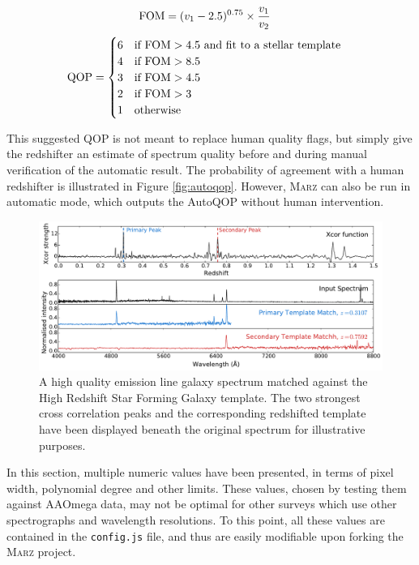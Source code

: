 \documentclass[5p]{elsarticle}
\newcommand{\marz}{\textsc{Marz}}
\begin{document}
\begin{align}
{\rm FOM} &= (v_1-2.5)^{0.75} \times \frac{v_1}{v_2} \label{eq:autoqop3}
\end{align}
\begin{align}
{\rm QOP} &= \begin{cases}6 & \text{if } {\rm FOM} > 4.5 \text{ and fit to a stellar template} \label{eq:autoqop2}\\
4 & \text{if } {\rm FOM} > 8.5  \\
3 & \text{if } {\rm FOM} > 4.5 \\
2 & \text{if } {\rm FOM} > 3 \\
1 & \text{otherwise} \end{cases}
\end{align}

This suggested QOP is not meant to replace human quality flags, but simply give the redshifter an estimate of spectrum quality before and during manual verification of the automatic result. The probability of agreement with a human redshifter is illustrated in Figure \ref{fig:autoqop}.  However, \marz{} can also be run in automatic mode, which outputs the AutoQOP without human intervention.






\begin{figure}[h]
\centering
\includegraphics[width=\textwidth]{xcors.pdf}
\caption{A high quality emission line galaxy spectrum matched against the High Redshift Star Forming Galaxy template. The two strongest cross correlation peaks and the corresponding redshifted template have been displayed beneath the original spectrum for illustrative purposes.}
\label{fig:xcors}
\end{figure}


In this section, multiple numeric values have been presented, in terms of pixel width, polynomial degree and other limits. These values, chosen by testing them against AAOmega data, may not be optimal for other surveys which use other spectrographs and wavelength resolutions. To this point, all these values are contained in the \verb;config.js; file, and thus are easily modifiable upon forking the \marz{} project.
\end{document}
